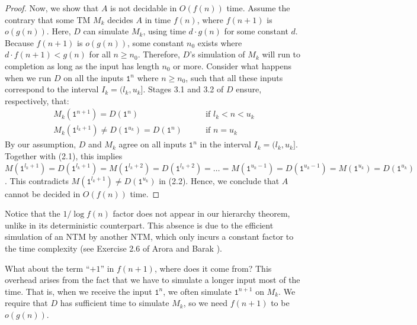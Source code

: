 \begin{proof}
  Now, we show that $A$ is not decidable in $O(f(n))$ time. Assume the contrary that some TM $M_k$ decides $A$ in time $f(n)$, where $f(n + 1)$ is $o(g(n))$. Here, $D$ can simulate $M_k$, using time $d \cdot g(n)$ for some constant $d$. Because $f(n + 1)$ is $o(g(n))$, some constant $n_0$ exists where $d \cdot f(n + 1) < g(n)$ for all $n \geq n_0$. Therefore, $D$'s simulation of $M_k$ will run to completion as long as the input has length $n_0$ or more. Consider what happens when we run $D$ on all the inputs $\texttt{1}^n$ where $n \geq n_0$, such that all these inputs correspond to the interval $I_k = (l_k, u_k]$. Stages 3.1 and 3.2 of $D$ ensure, respectively, that:
  \begin{align}
    \text{$M_k(\texttt{1}^{n + 1}) = D(\texttt{1}^n)$} & \qquad \text{if $l_k < n < u_k$} \\
    \text{$M_k(\texttt{1}^{l_k + 1}) \neq D(\texttt{1}^{u_k}) = D(\texttt{1}^n)$} & \qquad \text{if $n = u_k$}
  \end{align}
  By our assumption, $D$ and $M_k$ agree on all inputs $\texttt{1}^n$ in the interval $I_k = (l_k, u_k]$. Together with (2.1), this implies $M(\texttt{1}^{l_k + 1}) = D(\texttt{1}^{l_k + 1}) = M(\texttt{1}^{l_k + 2}) = D(\texttt{1}^{l_k + 2}) = \dots = M(\texttt{1}^{u_k - 1}) = D(\texttt{1}^{u_k - 1}) = M(\texttt{1}^{u_k}) = D(\texttt{1}^{u_k})$. This contradicts $M(\texttt{1}^{l_k + 1}) \neq D(\texttt{1}^{u_k})$ in (2.2). Hence, we conclude that $A$ cannot be decided in $O(f(n))$ time.
\end{proof}

\begin{remark}
  Notice that the $1 / \log f(n)$ factor does not appear in our hierarchy theorem, unlike in its deterministic counterpart. This absence is due to the efficient simulation of an NTM by another NTM, which only incurs a constant factor to the time complexity (see Exercise 2.6 of Arora and Barak \cite{arora2009computational}).
\end{remark}

\begin{remark}
  What about the term ``$+ 1$'' in $f(n + 1)$, where does it come from? This overhead arises from the fact that we have to simulate a longer input most of the time. That is, when we receive the input $\texttt{1}^{n}$, we often simulate $\texttt{1}^{n + 1}$ on $M_k$. We require that $D$ has sufficient time to simulate $M_k$, so we need $f(n + 1)$ to be $o(g(n))$.
\end{remark}


